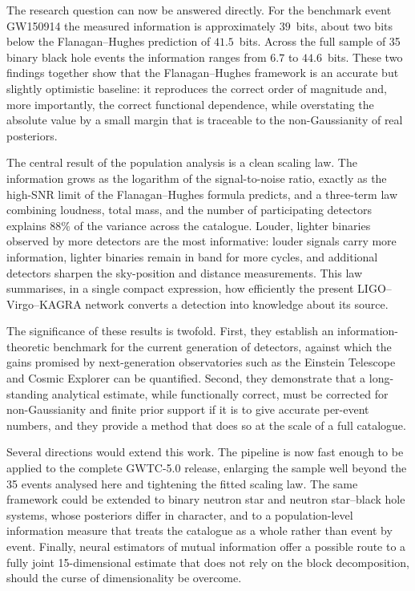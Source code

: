 \documentclass{phys400finalreport}
\begin{document}
The research question can now be answered directly. For the benchmark event
GW150914 the measured information is approximately $39$~bits, about two bits
below the Flanagan--Hughes prediction of $41.5$~bits. Across the full sample of
35 binary black hole events the information ranges from $6.7$ to $44.6$~bits.
These two findings together show that the Flanagan--Hughes framework is an
accurate but slightly optimistic baseline: it reproduces the correct order of
magnitude and, more importantly, the correct functional dependence, while
overstating the absolute value by a small margin that is traceable to the
non-Gaussianity of real posteriors.

The central result of the population analysis is a clean scaling law. The
information grows as the logarithm of the signal-to-noise ratio, exactly as the
high-SNR limit of the Flanagan--Hughes formula predicts, and a three-term law
combining loudness, total mass, and the number of participating detectors
explains $88\%$ of the variance across the catalogue. Louder, lighter binaries
observed by more detectors are the most informative: louder signals carry more
information, lighter binaries remain in band for more cycles, and additional
detectors sharpen the sky-position and distance measurements. This law
summarises, in a single compact expression, how efficiently the present
LIGO--Virgo--KAGRA network converts a detection into knowledge about its source.

The significance of these results is twofold. First, they establish an
information-theoretic benchmark for the current generation of detectors, against
which the gains promised by next-generation observatories such as the Einstein
Telescope and Cosmic Explorer can be quantified. Second, they demonstrate that
a long-standing analytical estimate, while functionally correct, must be
corrected for non-Gaussianity and finite prior support if it is to give
accurate per-event numbers, and they provide a method that does so at the scale
of a full catalogue.

Several directions would extend this work. The pipeline is now fast enough to
be applied to the complete GWTC-5.0 release, enlarging the sample well beyond
the 35 events analysed here and tightening the fitted scaling law. The same
framework could be extended to binary neutron star and neutron star--black hole
systems, whose posteriors differ in character, and to a population-level
information measure that treats the catalogue as a whole rather than event by
event. Finally, neural estimators of mutual information offer a possible route
to a fully joint 15-dimensional estimate that does not rely on the block
decomposition, should the curse of dimensionality be overcome.

\end{document}

